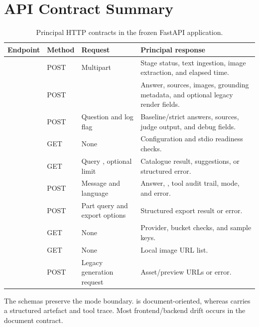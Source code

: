 \section{API Contract Summary}
\label{sec:api-contracts}

\begin{table}[htbp]
  \centering
  \small
  \caption{Principal HTTP contracts in the frozen FastAPI application.}
  \label{tab:api-contracts}
  \begin{tabularx}{\textwidth}{L{0.23\textwidth}L{0.09\textwidth}L{0.27\textwidth}Y}
    \toprule
    Endpoint & Method & Request & Principal response \\
    \midrule
     & POST & Multipart  & Stage status, text ingestion, image extraction, and elapsed time. \\
     & POST &  & Answer, sources, images, grounding metadata, and optional legacy render fields. \\
     & POST & Question and log flag & Baseline/strict answers, sources, judge output, and debug fields. \\
     & GET & None & Configuration and stdio readiness checks. \\
     & GET & Query , optional limit & Catalogue result, suggestions, or structured error. \\
     & POST & Message and language & Answer, , tool audit trail, mode, and error. \\
     & POST & Part query and export options & Structured export result or error. \\
     & GET & None & Provider, bucket checks, and sample keys. \\
     & GET & None & Local image URL list. \\
     & POST & Legacy generation request & Asset/preview URLs or error. \\
    \bottomrule
  \end{tabularx}
\end{table}

The schemas preserve the mode boundary.  is document-oriented, whereas  carries a structured artefact and tool trace. Most frontend/backend drift occurs in the document contract.

